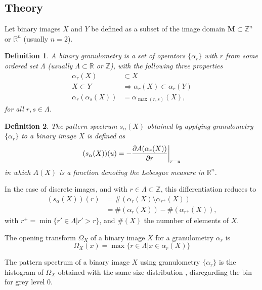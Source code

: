 \documentclass[b1]{sciposter}
\newtheorem{Def}{Definition}
\begin{document}
\begin{multicols}{2}
\section{Theory}

Let binary images $X$ and $Y$ be defined as a subset of the image domain 
${\mathbf M}\subset {\mathbb Z}^n$ or ${\mathbb R}^n$ (usually $n=2$). 
\begin{Def}
A binary 
granulometry is a set of operators $\{\alpha_r\}$ with $r$ from some ordered 
set $\Lambda$ (usually $\Lambda \subset {\mathbb R}$ or ${\mathbb Z}$), with 
the following three properties
\begin{align}
   \alpha_r(X) & \subset  X \label{eq:antiext} \\
   X \subset Y & \Rightarrow \alpha_r(X) \subset \alpha_r(Y) 
   \label{eq:increasing} \\
   \alpha_r(\alpha_s(X)) & =  \alpha_{\max(r,s)}(X) \label{eq:idempot},
\end{align}   
for all $r,s \in \Lambda$.
\end{Def}

\begin{Def}
The pattern spectrum $s_{\alpha}(X)$ obtained by applying 
granulometry $\{\alpha_r\}$ to a binary image $X$ is defined as
\begin{equation}
    (s_{\alpha}(X))(u) = 
    - \frac{\partial A(\alpha_r(X))}{\partial r}\bigg{\vert}_{r=u}
\end{equation}
in which $A(X)$ is a function denoting the Lebesgue measure in 
${\mathbb R}^n$.
\end{Def} 
In the case of discrete images, and with $r \in \Lambda \subset {\mathbb Z}$, 
this differentiation reduces to
\begin{align}
    (s_{\alpha}(X))(r)  & = \#(\alpha_{r}(X) \setminus \alpha_{r^+}(X)) \\ 
                        & = \#(\alpha_{r}(X)) - \#(\alpha_{r^+}(X)), 
\end{align}
with $r^+ = \min\{ r' \in \Lambda \vert r' > r \}$, and $\#(X)$ the 
numnber of elements of $X$.

The opening transform \cite{Nacken:thesis} $\Omega_X$ of a binary image $X$ 
for a granulometry ${\alpha_r}$ is
\begin{equation}
  \Omega_X(x) = \max\{ r \in \Lambda \vert x \in \alpha_r(X) \}
\end{equation}

The pattern spectrum of a binary image $X$ using granulometry 
$\{\alpha_r\}$ is the histogram of $\Omega_X$ obtained with the same 
size distribution \cite{Nacken:thesis}, disregarding the bin for grey level 0.





\end{multicols}
\end{document}
